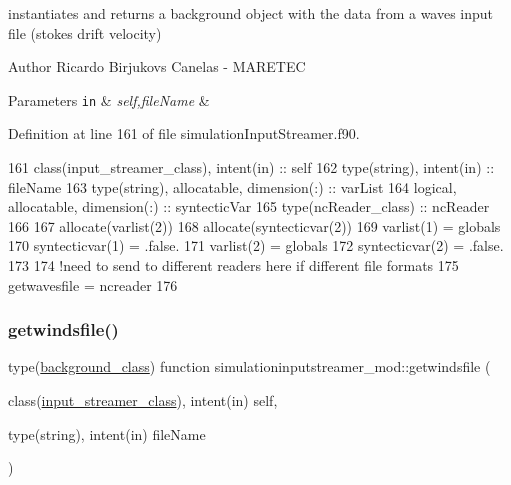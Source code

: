 instantiates and returns a background object with the data from a waves input file (stokes drift velocity) 

\begin{DoxyAuthor}{Author}
Ricardo Birjukovs Canelas -\/ M\+A\+R\+E\+T\+EC 
\end{DoxyAuthor}

\begin{DoxyParams}[1]{Parameters}
\mbox{\tt in}  & {\em self,file\+Name} & \\
\hline
\end{DoxyParams}


Definition at line 161 of file simulation\+Input\+Streamer.\+f90.


\begin{DoxyCode}
161     \textcolor{keywordtype}{class}(input\_streamer\_class), \textcolor{keywordtype}{intent(in)} :: self
162     \textcolor{keywordtype}{type}(string), \textcolor{keywordtype}{intent(in)} :: fileName
163     \textcolor{keywordtype}{type}(string), \textcolor{keywordtype}{allocatable}, \textcolor{keywordtype}{dimension(:)} :: varList
164     \textcolor{keywordtype}{logical}, \textcolor{keywordtype}{allocatable}, \textcolor{keywordtype}{dimension(:)} :: syntecticVar
165     \textcolor{keywordtype}{type}(ncReader\_class) :: ncReader
166 
167     \textcolor{keyword}{allocate}(varlist(2))
168     \textcolor{keyword}{allocate}(syntecticvar(2))
169     varlist(1) = globals%
170     syntecticvar(1) = .false.
171     varlist(2) = globals%
172     syntecticvar(2) = .false.
173 
174     \textcolor{comment}{!need to send to different readers here if different file formats}
175     getwavesfile = ncreader%
176 
\end{DoxyCode}
\mbox{\label{namespacesimulationinputstreamer__mod_ac69aeed5ee36930444f6e5389071994e}} 
\subsubsection{\texorpdfstring{getwindsfile()}{getwindsfile()}}
{\footnotesize\ttfamily type(\mbox{\hyperlink{structbackground__mod_1_1background__class}{background\+\_\+class}}) function simulationinputstreamer\+\_\+mod\+::getwindsfile (\begin{DoxyParamCaption}\item[{class(\mbox{\hyperlink{structsimulationinputstreamer__mod_1_1input__streamer__class}{input\+\_\+streamer\+\_\+class}}), intent(in)}]{self,  }\item[{type(string), intent(in)}]{file\+Name }\end{DoxyParamCaption})\hspace{0.3cm}{\ttfamily [private]}}



